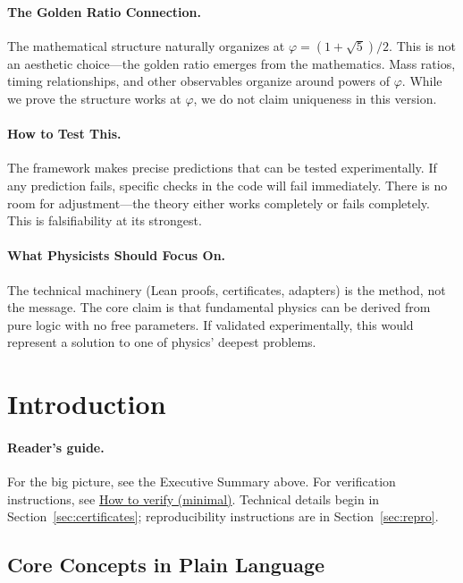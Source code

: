 \documentclass[11pt,a4paper,twoside]{article}
\numberwithin{equation}{section}
\theoremstyle{customthm}
\theoremstyle{customdef}
\theoremstyle{customrem}
\begin{document}
\paragraph{The Golden Ratio Connection.} The mathematical structure naturally organizes at $\varphi = (1+\sqrt{5})/2$. This is not an aesthetic choice—the golden ratio emerges from the mathematics. Mass ratios, timing relationships, and other observables organize around powers of $\varphi$. While we prove the structure works at $\varphi$, we do not claim uniqueness in this version.

\paragraph{How to Test This.} The framework makes precise predictions that can be tested experimentally. If any prediction fails, specific checks in the code will fail immediately. There is no room for adjustment—the theory either works completely or fails completely. This is falsifiability at its strongest.

\paragraph{What Physicists Should Focus On.} The technical machinery (Lean proofs, certificates, adapters) is the method, not the message. The core claim is that fundamental physics can be derived from pure logic with no free parameters. If validated experimentally, this would represent a solution to one of physics' deepest problems.

\newpage
\tableofcontents
\newpage

\section{Introduction}
\paragraph{Reader's guide.} For the big picture, see the Executive Summary above. For verification instructions, see \hyperlink{verify-minimal}{How to verify (minimal)}. Technical details begin in Section~\ref{sec:certificates}; reproducibility instructions are in Section~\ref{sec:repro}.

\subsection{Core Concepts in Plain Language}
\end{document}
